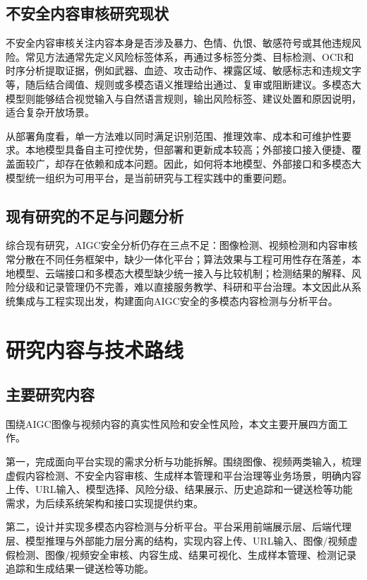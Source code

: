 \subsection{不安全内容审核研究现状}

不安全内容审核关注内容本身是否涉及暴力、色情、仇恨、敏感符号或其他违规风险。常见方法通常先定义风险标签体系，再通过多标签分类、目标检测、OCR和时序分析提取证据，例如武器、血迹、攻击动作、裸露区域、敏感标志和违规文字等，随后结合阈值、规则或多模态语义推理给出通过、复审或阻断建议。多模态大模型则能够结合视觉输入与自然语言规则，输出风险标签、建议处置和原因说明，适合复杂开放场景。

从部署角度看，单一方法难以同时满足识别范围、推理效率、成本和可维护性要求。本地模型具备自主可控优势，但部署和更新成本较高；外部接口接入便捷、覆盖面较广，却存在依赖和成本问题。因此，如何将本地模型、外部接口和多模态大模型统一组织为可用平台，是当前研究与工程实践中的重要问题。

\subsection{现有研究的不足与问题分析}

综合现有研究，AIGC安全分析仍存在三点不足：图像检测、视频检测和内容审核常分散在不同任务框架中，缺少一体化平台；算法效果与工程可用性存在落差，本地模型、云端接口和多模态大模型缺少统一接入与比较机制；检测结果的解释、风险分级和记录管理仍不完善，难以直接服务教学、科研和平台治理。本文因此从系统集成与工程实现出发，构建面向AIGC安全的多模态内容检测与分析平台。

\section{研究内容与技术路线}

\subsection{主要研究内容}

围绕AIGC图像与视频内容的真实性风险和安全性风险，本文主要开展四方面工作。

第一，完成面向平台实现的需求分析与功能拆解。围绕图像、视频两类输入，梳理虚假内容检测、不安全内容审核、生成样本管理和平台治理等业务场景，明确内容上传、URL输入、模型选择、风险分级、结果展示、历史追踪和一键送检等功能需求，为后续系统架构和接口实现提供约束。

第二，设计并实现多模态内容检测与分析平台。平台采用前端展示层、后端代理层、模型推理与外部能力层分离的结构，实现内容上传、URL输入、图像/视频虚假检测、图像/视频安全审核、内容生成、结果可视化、生成样本管理、检测记录追踪和生成结果一键送检等功能。

